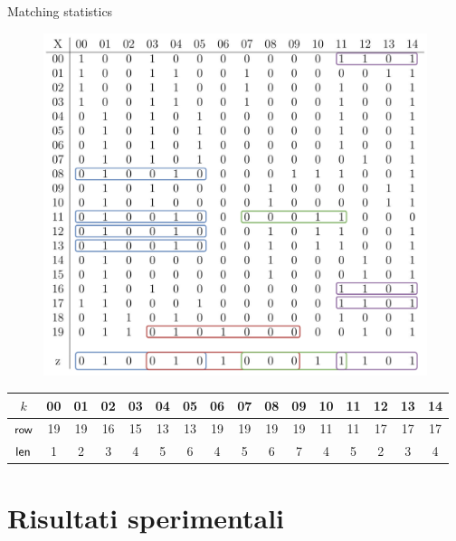 \documentclass[]{beamer}
\def\len{\mbox{\rm {\sf len}}}
\def\row{\mbox{\rm {\sf row}}}
\begin{document}
\begin{frame}{Matching statistics}
  \vspace{-0.35cm}
 \begin{figure}[H]
    \centering
    \includegraphics[scale = 0.205]{img/pbwtmatch.pdf}
  \end{figure}
  \vspace{-0.5cm}
  \begin{table}[H]
    \scriptsize
    \centering
    \begin{tabular}{c|ccccccccccccccc}
      $k$ & 00 & 01 & 02 & 03 & 04 &  {\color{nordcyan}05} & 06 & 07 & 08
      &  {\color{nordred}09} & 10 &  {\color{nordgreen}11} & 12 & 13
      &  {\color{nordpurple}14} \\
      \hline
      $\row$ & 19 & 19 & 16 & 15 & 13 &  {\color{nordcyan}13} & 19 & 19 & 19
      &  {\color{nordred}19} & 11 &  {\color{nordgreen}11} & 17 & 17
      &  {\color{nordpurple}17} \\
      $\len$ & 1 & 2 & 3 & 4 & 5 & {\color{nordcyan}6} & 4 & 5 & 6
      & {\color{nordred}7} & 4 & {\color{nordgreen}5} & 2 & 3
      & {\color{nordpurple}4}\\
    \end{tabular}
  \end{table}
\end{frame}
\section{Risultati sperimentali}
\end{document}

